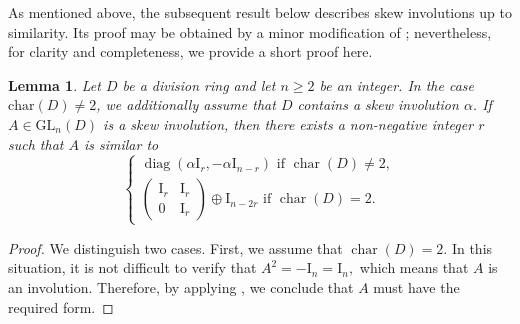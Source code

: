\documentclass[11pt]{article}
\newtheorem{lemma}[theorem]{Lemma}
\theoremstyle{definition}
\begin{document}
{{{{				As mentioned above, the subsequent result below describes skew involutions up to similarity. Its proof may be obtained by a minor modification of \cite{Pa_BiDuHaSo_2023}; nevertheless, for clarity and completeness, we provide a short proof here.
				
				\begin{lemma}\label{skew1}
					Let $D$ be a division ring and let $n\geq2$ be an integer. In the case $\mathrm{char}(D)\neq2$, we additionally assume that $D$ contains a skew involution $\alpha$. If $A\in\mathrm{GL}_n(D)$ is a skew involution, then there exists a non-negative integer $r$ such that $A$ is similar to $$\begin{cases}
						\operatorname{diag}(\alpha \mathrm{I}_r,-\alpha \mathrm{I}_{n-r}) \text{ if } \operatorname{char}(D)\neq2,\\
						\begin{pmatrix}
							\mathrm{I}_r & \mathrm{I}_r\\
							0 & \mathrm{I}_r
						\end{pmatrix}\oplus \mathrm{I}_{n-2r}  \text{ if } \operatorname{char}(D)=2.
					\end{cases}$$
				\end{lemma}
				
				\begin{proof}
					We distinguish two cases. First, we assume that $\operatorname{char}(D)=2$. In this situation, it is not difficult to verify that $A^{2}=-\mathrm{I}_{n}=\mathrm{I}_{n},$
					which means that $A$ is an involution. Therefore, by applying \cite[Proposition~2.3]{Pa_BiDuHaSo_2023}, we conclude that $A$ must have the required form.
					

\end{proof}}}}}
\end{document}
